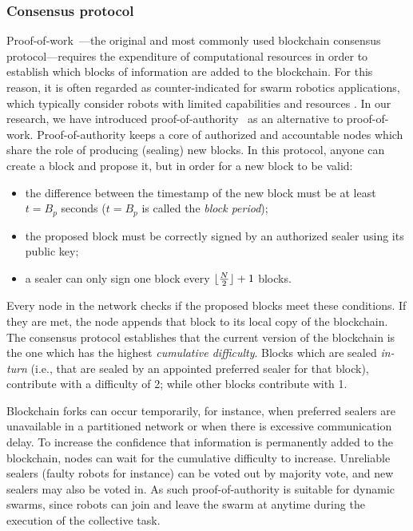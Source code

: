 \documentclass[runningheads]{llncs}
\DeclarePairedDelimiter\floor{\lfloor}{\rfloor}
\newcommand{\poa}{proof-of-authority\xspace}
\newcommand{\Poa}{Proof-of-authority\xspace}
\newcommand{\pow}{proof-of-work\xspace}
\newcommand{\Pow}{Proof-of-work\xspace}
\begin{document}
\subsubsection{Consensus protocol}
\label{sec:consensus-protocol}
\Pow~\cite{bitcoin_online}---the original and most commonly used blockchain consensus protocol---requires the expenditure of computational resources in order to establish which blocks of information are added to the blockchain. For this reason, it is often regarded as counter-indicated for swarm robotics applications, which typically consider robots with limited capabilities and resources \cite{dorigo_swarm_2008}.
In our research, we have introduced \poa~\cite{poa_online} as an alternative to \pow. \Poa keeps a core of authorized and accountable nodes which share the role of producing (sealing) new blocks. In this protocol, anyone can create a block and propose it, but in order for a new block to be valid:
\begin{itemize}
\item the difference between the timestamp of the new block must be at least $t=B_p$ seconds ($t=B_p$ is called the \emph{block period});
\item the proposed block must be correctly signed by an authorized sealer using its public key;
\item a sealer can only sign one block every $\floor{\frac{N}{2}} + 1$ blocks.
\end{itemize}
Every node in the network checks if the proposed blocks meet these conditions. If they are met, the node appends that block to its local copy of the blockchain. The consensus protocol establishes that the current version of the blockchain is the one which has the highest \emph{cumulative difficulty}. Blocks which are sealed \emph{in-turn} (i.e., that are sealed by an appointed preferred sealer for that block), contribute with a difficulty of 2; while other blocks contribute with 1.

Blockchain forks can occur temporarily, for instance, when preferred sealers are unavailable in a partitioned network or when there is excessive communication delay. To increase the confidence that information is permanently added to the blockchain, nodes can wait for the cumulative difficulty to increase. Unreliable sealers (faulty robots for instance) can be voted out by majority vote, and new sealers may also be voted in. As such \poa is suitable for dynamic swarms, since robots can join and leave the swarm at anytime during the execution of the collective task.
\end{document}
